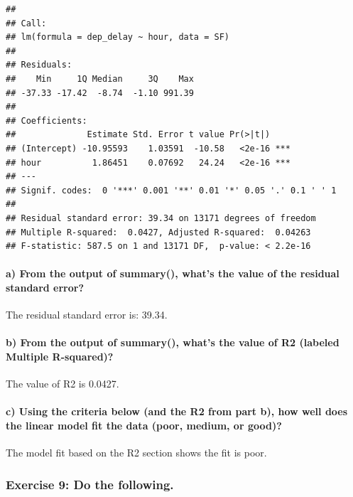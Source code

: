 \documentclass[
]{article}
\begin{document}
\begin{verbatim}
## 
## Call:
## lm(formula = dep_delay ~ hour, data = SF)
## 
## Residuals:
##    Min     1Q Median     3Q    Max 
## -37.33 -17.42  -8.74  -1.10 991.39 
## 
## Coefficients:
##              Estimate Std. Error t value Pr(>|t|)    
## (Intercept) -10.95593    1.03591  -10.58   <2e-16 ***
## hour          1.86451    0.07692   24.24   <2e-16 ***
## ---
## Signif. codes:  0 '***' 0.001 '**' 0.01 '*' 0.05 '.' 0.1 ' ' 1
## 
## Residual standard error: 39.34 on 13171 degrees of freedom
## Multiple R-squared:  0.0427, Adjusted R-squared:  0.04263 
## F-statistic: 587.5 on 1 and 13171 DF,  p-value: < 2.2e-16
\end{verbatim}

\hypertarget{a-from-the-output-of-summary-whats-the-value-of-the-residual-standard-error}{%
\paragraph{a) From the output of summary(), what's the value of the
residual standard
error?}\label{a-from-the-output-of-summary-whats-the-value-of-the-residual-standard-error}}

\hfill\break
The residual standard error is: 39.34.

\hypertarget{b-from-the-output-of-summary-whats-the-value-of-r2-labeled-multiple-r-squared}{%
\paragraph{b) From the output of summary(), what's the value of R2
(labeled Multiple
R-squared)?}\label{b-from-the-output-of-summary-whats-the-value-of-r2-labeled-multiple-r-squared}}

\hfill\break
The value of R2 is 0.0427.

\hypertarget{c-using-the-criteria-below-and-the-r2-from-part-b-how-well-does-the-linear-model-fit-the-data-poor-medium-or-good}{%
\paragraph{c) Using the criteria below (and the R2 from part b), how
well does the linear model fit the data (poor, medium, or
good)?}\label{c-using-the-criteria-below-and-the-r2-from-part-b-how-well-does-the-linear-model-fit-the-data-poor-medium-or-good}}

\hfill\break
The model fit based on the R2 section shows the fit is poor. \newpage

\hypertarget{exercise-9-do-the-following.}{%
\subsubsection{Exercise 9: Do the
following.}\label{exercise-9-do-the-following.}}
\end{document}
